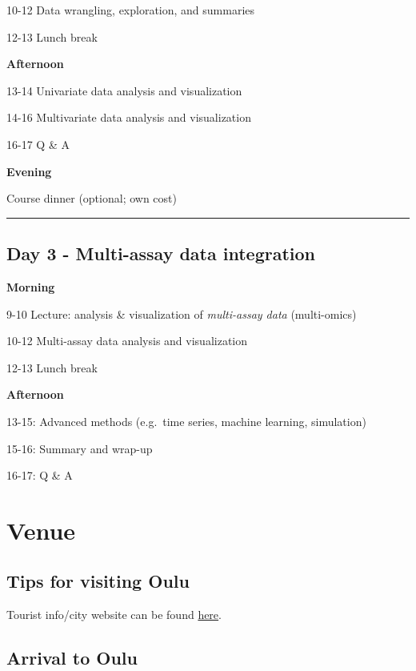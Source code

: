 \documentclass[
  oneside]{book}
\begin{document}
10-12 Data wrangling, exploration, and summaries

12-13 Lunch break

\textbf{Afternoon}

13-14 Univariate data analysis and visualization

14-16 Multivariate data analysis and visualization

16-17 Q \& A

\textbf{Evening}

Course dinner (optional; own cost)

\begin{center}\rule{0.5\linewidth}{0.5pt}\end{center}

\hypertarget{day-3---multi-assay-data-integration}{%
\section{Day 3 - Multi-assay data integration}\label{day-3---multi-assay-data-integration}}

\textbf{Morning}

9-10 Lecture: analysis \& visualization of \emph{multi-assay data} (multi-omics)

10-12 Multi-assay data analysis and visualization

12-13 Lunch break

\textbf{Afternoon}

13-15: Advanced methods (e.g.~time series, machine learning, simulation)

15-16: Summary and wrap-up

16-17: Q \& A

\hypertarget{venue}{%
\chapter{Venue}\label{venue}}

\hypertarget{tips-for-visiting-oulu}{%
\section{Tips for visiting Oulu}\label{tips-for-visiting-oulu}}

Tourist info/city website can be found \href{https://visitoulu.fi/en/}{here}.

\hypertarget{arrival-to-oulu}{%
\section{Arrival to Oulu}\label{arrival-to-oulu}}
\end{document}
